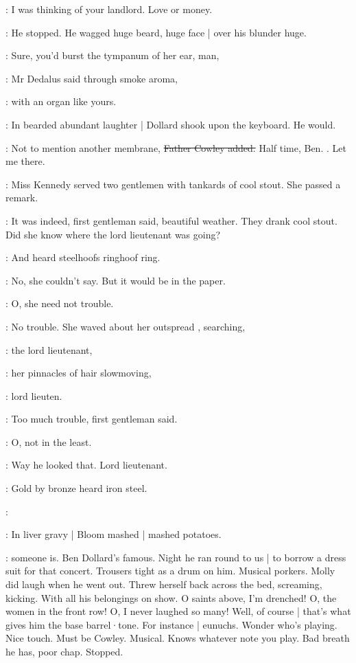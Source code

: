 \dollard:
I was thinking of your landlord.
Love or money.

:
He stopped.
He wagged huge beard,
huge face |
over his blunder huge.

\simon:
Sure,
you'd burst the tympanum of her ear,
man,

:
Mr Dedalus said through smoke aroma,

\simon:
with an organ like yours.

:
In bearded abundant laughter |
Dollard shook upon the keyboard.
He would.

\cowley:
Not to mention another membrane,
\sout{Father Cowley added.}
Half time, Ben.
.
Let me there.

:
Miss Kennedy served two gentlemen with tankards of cool stout.
She passed a remark.

:
It was indeed,
first gentleman said,
beautiful weather.
They drank cool stout.
Did she know where the lord lieutenant was going?

:
And heard steelhoofs ringhoof ring.

:
No,
she couldn't say.
But it would be in the paper.

:
O, she need not trouble.

:
No trouble.
She waved about her outspread ,
searching,

\MissKInt:
the lord lieutenant,

:
her pinnacles of hair slowmoving,

\MissKInt:
lord lieuten.

:
Too much trouble,
first gentleman said.

:
O, not in the least.

\MissKInt:
Way he looked that.
Lord lieutenant.

:
Gold by bronze
heard iron steel.%

\dollard:

:
In liver gravy |
Bloom mashed |
mashed potatoes.

\BloomIntB:
 someone is.
Ben Dollard's famous.
Night he ran round to us |
to borrow a dress suit for that concert.
Trousers tight as a drum on him.
Musical porkers.
Molly did laugh when he went out.
Threw herself back across the bed,
screaming,
kicking.
With all his belongings on show.
O saints above,
I'm drenched!
O, the women in the front row!
O, I never laughed so many!
Well,
of course |
that's what gives him the base barrel·tone.
For instance |
eunuchs.
Wonder who's playing.
Nice touch.
Must be Cowley.
Musical.
Knows whatever note you play.
Bad breath he has,
poor chap.
Stopped.

